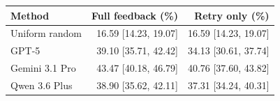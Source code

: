 \begin{tabular}{lrr}
\toprule
Method & Full feedback (\%) & Retry only (\%) \\
\midrule
Uniform random & 16.59 [14.23, 19.07] & 16.59 [14.23, 19.07] \\
GPT-5 & 39.10 [35.71, 42.42] & 34.13 [30.61, 37.74] \\
Gemini 3.1 Pro & 43.47 [40.18, 46.79] & 40.76 [37.60, 43.82] \\
Qwen 3.6 Plus & 38.90 [35.62, 42.11] & 37.31 [34.24, 40.31] \\
\bottomrule
\end{tabular}
